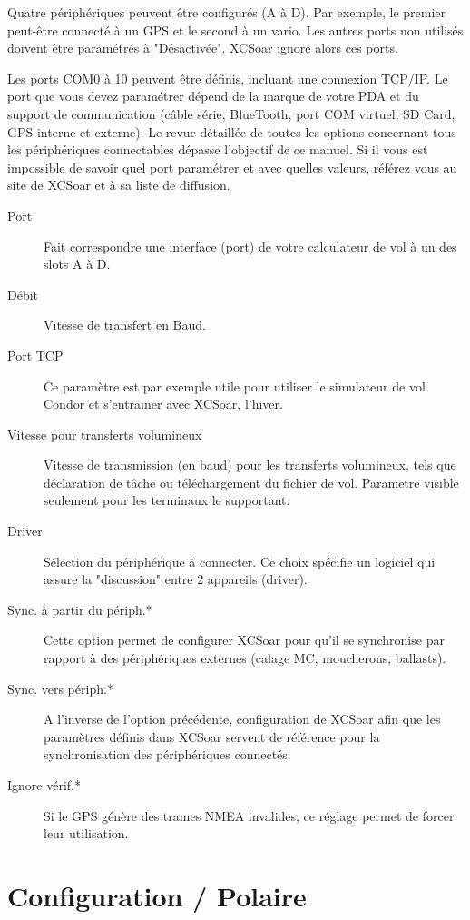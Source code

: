 Quatre périphériques peuvent être configurés (A à D). Par exemple, le premier peut-être connecté à un GPS et le second à un vario. Les autres ports non utilisés doivent être paramétrés à "Désactivée". XCSoar ignore alors ces ports.

Les ports COM0 à 10 peuvent être définis, incluant une connexion TCP/IP. Le port que vous devez paramétrer dépend de la marque de votre PDA et du support de communication (câble série, BlueTooth, port COM virtuel, SD Card, GPS interne et externe). Le revue détaillée de toutes les options concernant tous les périphériques connectables dépasse l'objectif de ce manuel. Si il vous est impossible de savoir quel port paramétrer et avec quelles valeurs, référez vous au site de XCSoar et à sa liste de diffusion.

\begin{description}
\item[Port]  Fait correspondre une interface (port) de votre calculateur de vol à un des slots A à D.
\item[Débit]  Vitesse de transfert en Baud.
\item[Port TCP]  Ce paramètre est par exemple utile pour utiliser le simulateur de vol Condor et s'entrainer avec XCSoar, l'hiver.
\item[Vitesse pour transferts volumineux]  Vitesse de transmission (en baud) pour les transferts volumineux, tels que déclaration de tâche ou téléchargement du fichier de vol. Parametre visible seulement pour les terminaux le supportant.
\item[Driver]  Sélection du périphérique à connecter. Ce choix spécifie un logiciel qui assure la "discussion" entre 2 appareils (driver).
\item[Sync. à partir du périph.*]  Cette option permet de configurer XCSoar pour qu'il se synchronise par rapport à des périphériques externes (calage MC, moucherons, ballasts).
\item[Sync. vers périph.*]  A l'inverse de l'option précédente, configuration de XCSoar afin que les paramètres définis dans XCSoar servent de référence pour la synchronisation des périphériques connectés.
\item[Ignore vérif.*] Si le GPS génère des trames NMEA invalides, ce réglage permet de forcer leur utilisation.
\end{description}


\section{Configuration / Polaire}

